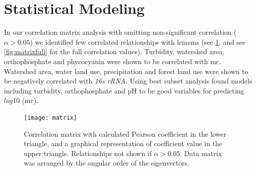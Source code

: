 \section{Statistical Modeling}

In our correlation matrix analysis with omitting non-significant correlation ($\alpha>0.05$) we identified few correlated relationships with \gls{lcmsms} (see \ref{matrix}, and see \ref{fig:matrixfull} for the full correlation values). Turbidity, watershed area, orthophosphate and phycocyanin were shown to be correlated with \gls{mc}. Watershed area, water land use, precipitation and forest land use were shown to be negatively correlated with \emph{16s rRNA}. Using best subset analysis found models including turbidity, orthophosphate and pH to be good variables for predicting  $log10$ (\gls{mc}).  


\begin{figure}
	\texttt{[image: matrix]}
	\vspace*{-15mm}
	\caption{
  Correlation matrix with calculated Pearson coefficient in the lower triangle, and a graphical representation of coefficient value in the upper triangle. Relationships not shown if $\alpha>0.05$. Data matrix was arranged by the angular order of the eigenvectors.}
	\label{matrix}
\end{figure}





